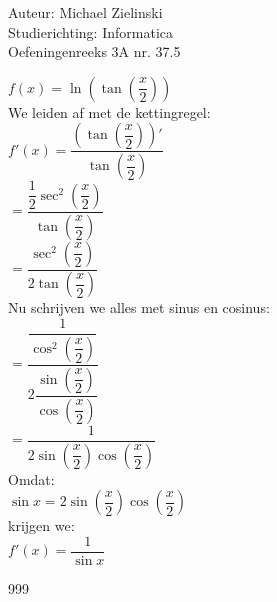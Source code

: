 \documentclass[a4paper]{article}
\begin{document}
  
\noindent \large Auteur: Michael Zielinski \\
\noindent \large Studierichting: Informatica\\
\noindent \large Oefeningenreeks 3A nr. 37.5\\

\medskip

\normalsize

$ f(x) = \ln\left(\tan\left(\dfrac{x}{2}\right)\right) $ \\

We leiden af met de kettingregel: \\

$ f'(x)
= \dfrac{\left(\tan\left(\dfrac{x}{2}\right)\right)'}{\tan\left(\dfrac{x}{2}\right)} $ \\

$ = \dfrac{\dfrac{1}{2}\sec^2\left(\dfrac{x}{2}\right)}
{\tan\left(\dfrac{x}{2}\right)} $ \\

$ = \dfrac{\sec^2\left(\dfrac{x}{2}\right)}
{2\tan\left(\dfrac{x}{2}\right)} $ \\

Nu schrijven we alles met sinus en cosinus: \\

$ = \dfrac{\dfrac{1}{\cos^2\left(\dfrac{x}{2}\right)}}
{2\dfrac{\sin\left(\dfrac{x}{2}\right)}{\cos\left(\dfrac{x}{2}\right)}} $ \\

$ = \dfrac{1}{2\sin\left(\dfrac{x}{2}\right)\cos\left(\dfrac{x}{2}\right)} $ \\

Omdat: \\

$ \sin x = 2\sin\left(\dfrac{x}{2}\right)\cos\left(\dfrac{x}{2}\right) $ \\

krijgen we: \\

$ f'(x) = \dfrac{1}{\sin x} $ \\

\begin{thebibliography}{999}
\end{thebibliography}
\end{document}
